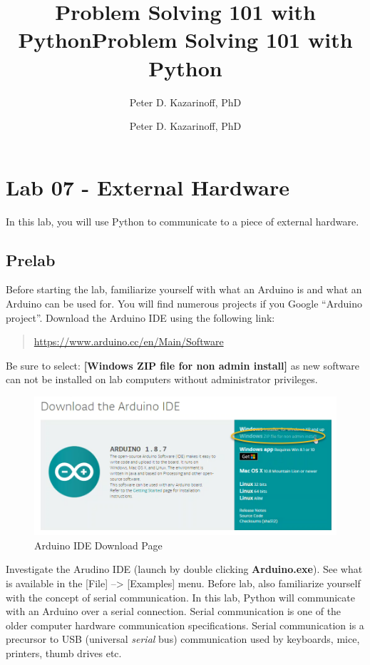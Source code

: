 \documentclass[11pt]{article}
\title{Problem Solving 101 with Python}
\author{Peter D. Kazarinoff, PhD}
\date{}
\title{Problem Solving 101 with Python}
\author{Peter D. Kazarinoff, PhD}
\date{}
\begin{document}
    
    

    
    

    
    \hypertarget{lab-07---external-hardware}{%
\section{Lab 07 - External Hardware}\label{lab-07---external-hardware}}

    In this lab, you will use Python to communicate to a piece of external
hardware.

    \hypertarget{prelab}{%
\subsection{Prelab}\label{prelab}}

Before starting the lab, familiarize yourself with what an Arduino is
and what an Arduino can be used for. You will find numerous projects if
you Google ``Arduino project''. Download the Arduino IDE using the
following link:

\begin{quote}
\url{https://www.arduino.cc/en/Main/Software}
\end{quote}

Be sure to select: \textbf{{[}Windows ZIP file for non admin install{]}}
as new software can not be installed on lab computers without
administrator privileges.

\begin{figure}
\centering
\includegraphics{images/arduino_download_page.png}
\caption{Arduino IDE Download Page}
\end{figure}

Investigate the Arudino IDE (launch by double clicking
\textbf{Arduino.exe}). See what is available in the {[}File{]}
--\textgreater{} {[}Examples{]} menu. Before lab, also familiarize
yourself with the concept of serial communication. In this lab, Python
will communicate with an Arduino over a serial connection. Serial
communication is one of the older computer hardware communication
specifications. Serial communication is a precursor to USB (universal
\emph{serial} bus) communication used by keyboards, mice, printers,
thumb drives etc.
\end{document}
